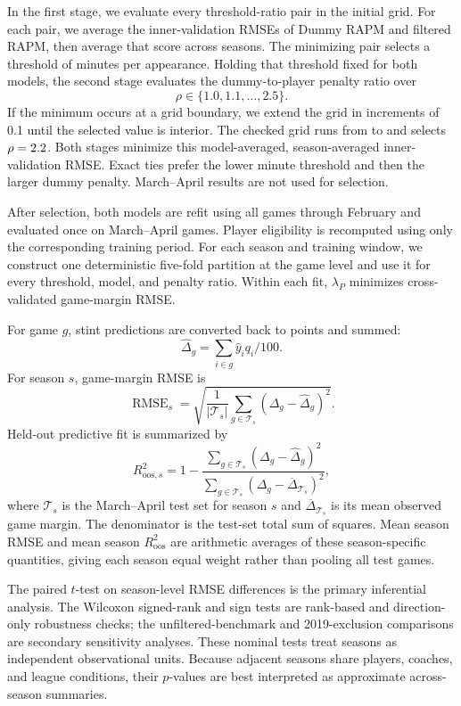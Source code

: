 \documentclass[12pt]{article}
\begin{document}
In the first stage, we evaluate every threshold-ratio pair in the initial grid.
For each pair, we average the inner-validation RMSEs of Dummy RAPM and filtered
RAPM, then average that score across seasons. The minimizing pair selects a
threshold of \SelectedThreshold{} minutes per appearance. Holding that
threshold fixed for both models, the second stage evaluates the dummy-to-player
penalty ratio over
\[
\rho\in\{1.0,1.1,\ldots,2.5\}.
\]
If the minimum occurs at a grid boundary, we extend the grid in increments of
0.1 until the selected value is interior. The checked grid runs from
\CheckedPenaltyMinimum{} to \CheckedPenaltyMaximum{} and selects
$\rho=2.2$.
Both stages minimize this model-averaged, season-averaged inner-validation
RMSE. Exact ties prefer the lower minute threshold and then the larger dummy
penalty. March--April results are not used for selection.

After selection, both models are refit using all games through February and
evaluated once on March--April games. Player eligibility is recomputed using
only the corresponding training period. For each season and training window,
we construct one deterministic five-fold partition at the game level and use
it for every threshold, model, and penalty ratio. Within each fit, $\lambda_P$
minimizes cross-validated game-margin RMSE.

For game $g$, stint predictions are converted back to points and summed:
\[
\widehat{\Delta}_g
=
\sum_{i\in g}\widehat{y}_i q_i/100.
\]
For season $s$, game-margin RMSE is
\[
\operatorname{RMSE}_s
=
\sqrt{
\frac{1}{|\mathcal{T}_s|}
\sum_{g\in\mathcal{T}_s}
(\Delta_g-\widehat{\Delta}_g)^2
}.
\]
Held-out predictive fit is summarized by
\[
R^2_{\mathrm{oos},s}
=
1-\frac{\sum_{g\in\mathcal{T}_s}
(\Delta_g-\widehat{\Delta}_g)^2}
{\sum_{g\in\mathcal{T}_s}
(\Delta_g-\overline{\Delta}_{\mathcal{T}_s})^2},
\]
where $\mathcal{T}_s$ is the March--April test set for season $s$ and
$\overline{\Delta}_{\mathcal{T}_s}$ is its mean observed game margin. The
denominator is the test-set total sum of squares. Mean season RMSE and mean
season $R^2_{\mathrm{oos}}$ are arithmetic averages of these season-specific
quantities, giving each season equal weight rather than pooling all test games.

The paired $t$-test on season-level RMSE differences is the primary
inferential analysis. The Wilcoxon signed-rank and sign tests are rank-based
and direction-only robustness checks; the unfiltered-benchmark and
2019-exclusion comparisons are secondary sensitivity analyses. These nominal
tests treat seasons as independent observational units. Because adjacent
seasons share players, coaches, and league conditions, their $p$-values are
best interpreted as approximate across-season summaries.
\end{document}
